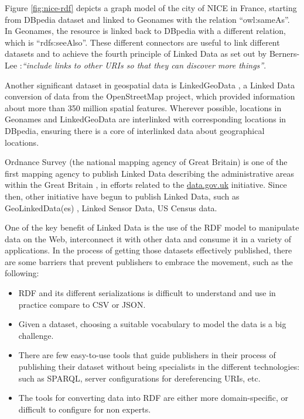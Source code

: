 Figure \ref{fig:nice-rdf} depicts a graph model of the city of NICE in France, starting from DBpedia \cite{dbpedia2009} dataset and linked to Geonames with the relation ``owl:sameAs''. In Geonames, the resource is linked back to DBpedia with a different relation, which is ``rdfs:seeAlso''. These different connectors are useful to link different datasets and to achieve the fourth principle of Linked Data as set out by Berners-Lee \cite{timld}:\textit{``include links to other URIs so that they can discover more things''}. 

Another significant dataset in geospatial data is LinkedGeoData \cite{linkedgeodata}, a Linked Data conversion of data from the OpenStreetMap project, which provided information about more than 350 million spatial features. Wherever possible, locations in Geonames and LinkedGeoData are interlinked with corresponding locations in DBpedia, ensuring there is a core of interlinked data about geographical locations.

Ordnance Survey (the national mapping agency of Great Britain) is one of the first mapping agency to publish Linked Data describing the administrative areas within the Great Britain \cite{Goodwin2008}, in efforts related to the \url{data.gov.uk} initiative. Since then, other initiative have begun to publish Linked Data, such as GeoLinkedData(es) \cite{deLeon2010}, Linked Sensor Data, US Census data. 

One of the key benefit of Linked Data is the use of the  RDF model to manipulate data on the Web, interconnect it with other data and consume it in a variety of applications. In the process of getting those datasets effectively published, there are some barriers that prevent publishers to embrace the movement, such as the following:
\begin{itemize}
\item RDF and its different serializations is difficult to understand and use in practice compare to CSV or JSON.
\item Given a dataset, choosing a suitable vocabulary to model the data is a big challenge.
\item There are few easy-to-use tools that guide publishers in their process of publishing their dataset without being specialists in the different technologies: such as SPARQL, server configurations for dereferencing URIs, etc.
\item The tools for converting data into RDF are either more domain-specific, or difficult to configure for non experts.
\end{itemize}

